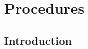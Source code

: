 \chapter{Procedures} \label{cha:pro}

\clearpage

\section{Introduction}  %

\clearpage

\clearpage
